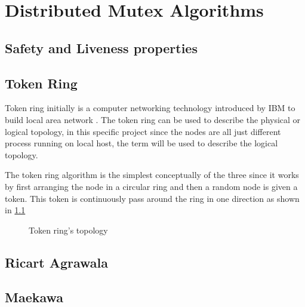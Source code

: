 \chapter{\centering Distributed Mutex Algorithms}
\label{chap:algorithms}

\section{Safety and Liveness properties}

\section{Token Ring}
Token ring initially is a computer networking technology introduced by IBM 
to build local area network \cite{wiki_token_ring}. The token ring can be used 
to describe the physical or logical topology, in this specific project since 
the nodes are all just different process running on local host, the term will be
used to describe the logical topology.

The token ring algorithm is the simplest conceptually of the three since it works 
by first arranging the node in a circular ring and then a random node is given a 
token. This token is continuously pass around the ring in one direction as shown in
\ref{fig:token_ring_top}

\begin{figure}[htbp]
  \centering
  
  \caption{Token ring's topology}
  \label{fig:token_ring_top}
\end{figure}

\section{Ricart Agrawala}

\section{Maekawa}


